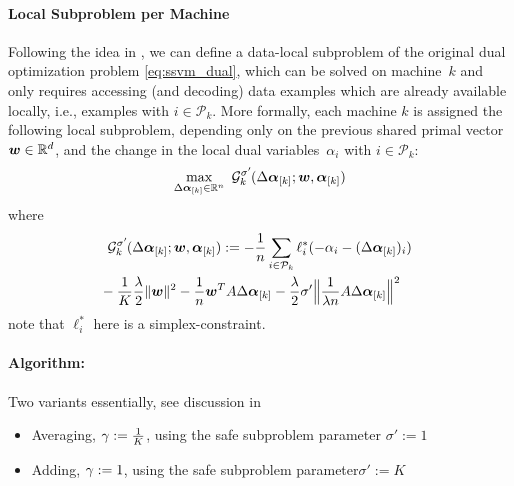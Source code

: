 \paragraph{Local Subproblem per Machine}
Following the idea in \citep{Ma:2015ti}, we can define a data-local subproblem of the original dual optimization problem \eqref{eq:ssvm_dual}, which can be solved on machine~$k$ and only requires accessing (and decoding) data examples which are already available locally, i.e., examples with $i\in\mathcal{P}_k$. More formally, each machine $k$ is assigned the following local subproblem, depending only on the previous shared primal vector ${\bm{w}}\in\mathbb{R}^d$, and the change in the local dual variables~$\alpha_i$ with $i\in\mathcal{P}_k$:
\begin{equation} 
\max_{\vsubset{\Delta \alphav}{k}\in\R^{n}} \ %
\Ggk(  \vsubset{\Delta \alphav}{k}; \wv, \vsubset{\alphav}{k})
\end{equation} 
where \begin{align} 
&\Ggk(  \vsubset{\Delta \alphav}{k}; \wv, \vsubset{\alphav}{k})
:=
-\frac1n\sum_{i \in \mathcal{P}_k} 
\ell_i^*(-\alpha_i - (\vsubset{\Delta \alphav}{k})_i)
\nonumber
\\
&\hspace{-2mm} 
- \frac1K 
\frac{\lambda}{2}
\|\wv\|^2
-\frac1n
\wv^T A \vsubset{\Delta \alphav}{k}
- \frac\lambda2
 \sigma'  \Big\|\frac1{\lambda n} A \vsubset{\Delta \alphav}{k}\Big\|^2
 \label{eq:subproblem}
\end{align}
note that $\ell_i^*$ here is a simplex-constraint.

\paragraph{Algorithm:}
Two variants essentially, see discussion in \citep{Ma:2015ti}
\begin{itemize}
\item \cocoa Averaging, $\gamma := \frac1K$, using the safe subproblem parameter $\sigma':=1$
\item \cocoap Adding, $\gamma := 1$, using the safe subproblem parameter$\sigma':=K$ 
\end{itemize}

